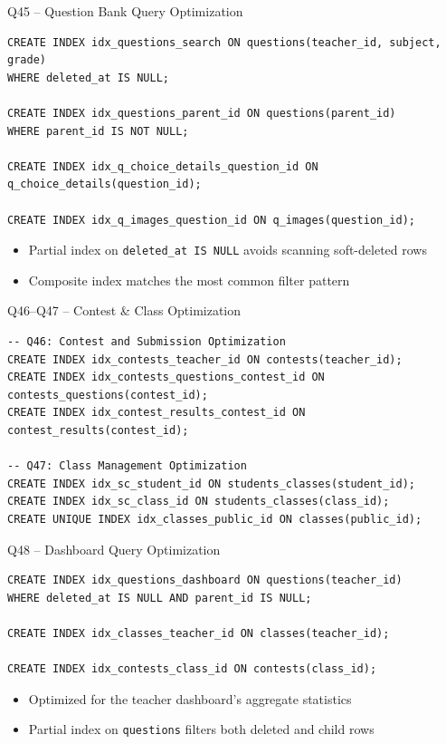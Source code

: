 \documentclass[aspectratio=169, 10pt]{beamer}
\begin{document}
\begin{frame}[fragile]{Q45 -- Question Bank Query Optimization}
    \begin{lstlisting}
CREATE INDEX idx_questions_search ON questions(teacher_id, subject, grade) 
WHERE deleted_at IS NULL;

CREATE INDEX idx_questions_parent_id ON questions(parent_id) 
WHERE parent_id IS NOT NULL;

CREATE INDEX idx_q_choice_details_question_id ON q_choice_details(question_id);

CREATE INDEX idx_q_images_question_id ON q_images(question_id);
    \end{lstlisting}
    \vspace{0.2cm}
    \begin{itemize}
        \item Partial index on \texttt{deleted\_at IS NULL} avoids scanning soft-deleted rows
        \item Composite index matches the most common filter pattern
    \end{itemize}
\end{frame}


\begin{frame}[fragile]{Q46--Q47 -- Contest \& Class Optimization}
    \begin{lstlisting}
-- Q46: Contest and Submission Optimization
CREATE INDEX idx_contests_teacher_id ON contests(teacher_id);
CREATE INDEX idx_contests_questions_contest_id ON contests_questions(contest_id);
CREATE INDEX idx_contest_results_contest_id ON contest_results(contest_id);

-- Q47: Class Management Optimization
CREATE INDEX idx_sc_student_id ON students_classes(student_id);
CREATE INDEX idx_sc_class_id ON students_classes(class_id);
CREATE UNIQUE INDEX idx_classes_public_id ON classes(public_id);
    \end{lstlisting}
\end{frame}


\begin{frame}[fragile]{Q48 -- Dashboard Query Optimization}
    \begin{lstlisting}
CREATE INDEX idx_questions_dashboard ON questions(teacher_id) 
WHERE deleted_at IS NULL AND parent_id IS NULL;

CREATE INDEX idx_classes_teacher_id ON classes(teacher_id);

CREATE INDEX idx_contests_class_id ON contests(class_id);
    \end{lstlisting}
    \vspace{0.2cm}
    \begin{itemize}
        \item Optimized for the teacher dashboard's aggregate statistics
        \item Partial index on \texttt{questions} filters both deleted and child rows
    \end{itemize}
\end{frame}
\end{document}
